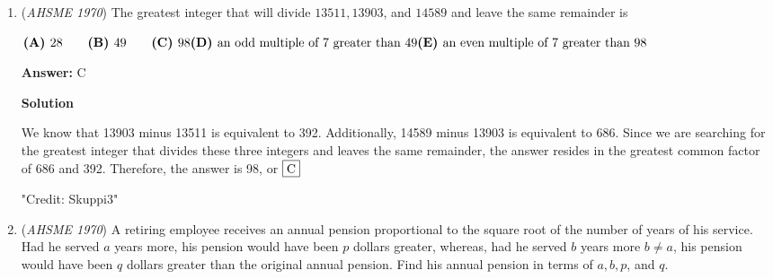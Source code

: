 \begin{enumerate}
\textbf{Solution 2}

Consider the numbers from $0000-9999$. We have $40000$ digits and each has equal an probability of being $0,1,2....9$.Thus, our desired sum is $4000\left( \frac{9 \cdot 10}{2} \right)+1=4000(45)+1=\boxed{\text{A)}180001}.$

 \textit{Credit: Math1331Math}

 



\textbf{Solution 3}

As in Solution 2, we consider the four digit numbers from $0000-9999.$ We see that we have $10000\times4=40000$ digits with each digit  appearing equally.

 Thus, the digit sum will be the average of the digits multiplied by $40000.$ The digit average comes out to be $\frac{0+9}{2},$ since all digits are consecutive.

 So, our answer will be $\frac{9}{2} \times 40000 = 180000.$ However, since we purposely did not include $10000,$ we add one to get our final answer as $\boxed{\textbf{(A)}180001}.$

 Solution by davidaops.

 \textit{Credit to Math1331Math}

 


	\item (\textit{AHSME 1970}) The greatest integer that will divide $13511, 13903$, and $14589$ and leave the same remainder is


 $\textbf{(A) }28\qquad \textbf{(B) }49\qquad \textbf{(C) }98\qquad\\ \textbf{(D) }\text{an odd multiple of }7\text{ greater than }49\qquad\\ \textbf{(E) }\text{an even multiple of }7\text{ greater than }98$

 \textbf{Answer: }C



\textbf{Solution}

We know that 13903 minus 13511 is equivalent to 392. Additionally, 14589 minus 13903 is equivalent to 686. Since we are searching for the greatest integer that divides these three integers and leaves the same remainder, the answer resides in the greatest common factor of 686 and 392. Therefore, the answer is 98, or $\fbox{C}$

 "Credit: Skuppi3"

 


	\item (\textit{AHSME 1970}) A retiring employee receives an annual pension proportional to the square root of the number of years of his service. 
Had he served $a$ years more, his pension would have been $p$ dollars greater, whereas, had he served $b$ years more $b\neq a$, 
his pension would have been $q$ dollars greater than the original annual pension. Find his annual pension in terms of $a,b,p$, and $q$.



\end{enumerate}
